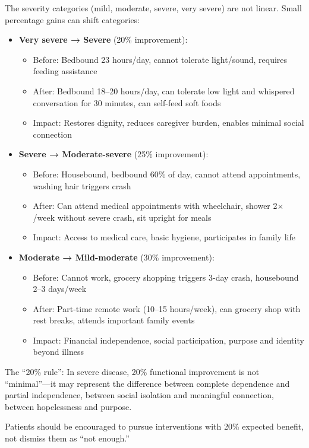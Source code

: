 \begin{observation}
\label{obs:functional-transitions}
The severity categories (mild, moderate, severe, very severe) are not linear. Small percentage gains can shift categories:

\begin{itemize}
    \item \textbf{Very severe → Severe} (20\% improvement):
    \begin{itemize}
        \item Before: Bedbound 23 hours/day, cannot tolerate light/sound, requires feeding assistance
        \item After: Bedbound 18--20 hours/day, can tolerate low light and whispered conversation for 30 minutes, can self-feed soft foods
        \item Impact: Restores dignity, reduces caregiver burden, enables minimal social connection
    \end{itemize}

    \item \textbf{Severe → Moderate-severe} (25\% improvement):
    \begin{itemize}
        \item Before: Housebound, bedbound 60\% of day, cannot attend appointments, washing hair triggers crash
        \item After: Can attend medical appointments with wheelchair, shower 2$\times$/week without severe crash, sit upright for meals
        \item Impact: Access to medical care, basic hygiene, participates in family life
    \end{itemize}

    \item \textbf{Moderate → Mild-moderate} (30\% improvement):
    \begin{itemize}
        \item Before: Cannot work, grocery shopping triggers 3-day crash, housebound 2--3 days/week
        \item After: Part-time remote work (10--15 hours/week), can grocery shop with rest breaks, attends important family events
        \item Impact: Financial independence, social participation, purpose and identity beyond illness
    \end{itemize}
\end{itemize}

The ``20\% rule'': In severe disease, 20\% functional improvement is not ``minimal''---it may represent the difference between complete dependence and partial independence, between social isolation and meaningful connection, between hopelessness and purpose.

Patients should be encouraged to pursue interventions with 20\% expected benefit, not dismiss them as ``not enough.''
\end{observation}

